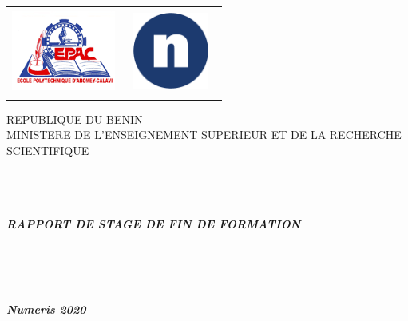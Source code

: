 		\begin{titlepage}
		\begin{center}
			\begin{tabular}{p{12cm}p{12cm}}
				\includegraphics[height=2.8cm,width=3.4cm]{garde/epac.png}
				&
				\includegraphics[height=2.5cm,width=3cm]{garde/N.png}
			\end{tabular}
			\begin{bf}
				REPUBLIQUE DU BENIN\\
				\vspace{0.5cm}
				MINISTERE DE L'ENSEIGNEMENT SUPERIEUR ET DE LA RECHERCHE SCIENTIFIQUE\\
				\vspace{0.5cm}
				\\
				
				\vspace{0.5cm}
			\end{bf}
			\vspace{1cm}
			\textbf{{}}\\
			\vspace{0.75cm}
			\hrulefill\\
			\textbf{\textsl{RAPPORT DE STAGE  DE FIN DE FORMATION }}\\
			\hrulefill\\
			\vspace{1cm}
			\\[1ex]
			
			\\
			\vspace{5cm}
			\begin{center}
				\textbf{\textsl{ Numeris 2020}}
			\end{center}
			
		\end{center}
	\end{titlepage}